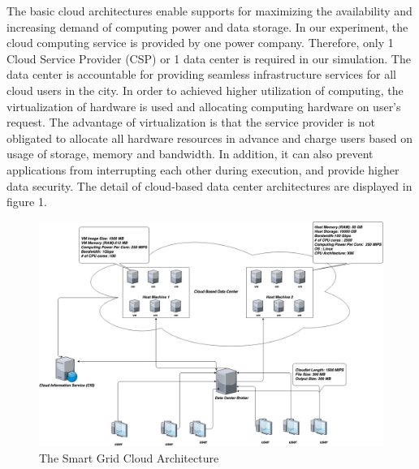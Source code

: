 \documentclass[12pt]{article}
\begin{document}
The basic cloud architectures enable supports for maximizing the availability and increasing demand of computing power and data storage\cite{ok2}. In our experiment, the cloud computing service is provided by one power company. Therefore, only 1 Cloud Service Provider (CSP) or 1 data center is required in our simulation. The data center is accountable for providing seamless infrastructure services for all cloud users in the city. In order to achieved higher utilization of computing, the virtualization of hardware is used and allocating computing hardware on user's request. The advantage of virtualization is that the service provider is not obligated to allocate all  hardware resources in advance and charge users based on usage of storage, memory and bandwidth. In addition, it can also prevent applications from interrupting each other during execution, and provide higher data security. The detail of cloud-based data center architectures are displayed in figure 1.

\begin{figure}[ht!]
\centering
\includegraphics[scale=0.3]{Smart_Grid_Cloud.png}
\caption{The Smart Grid Cloud Architecture}
\end{figure}
\end{document}
